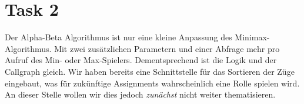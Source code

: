 \section{Task 2}
Der Alpha-Beta Algorithmus ist nur eine kleine Anpassung des Minimax-Algorithmus. Mit zwei zusätzlichen Parametern und einer Abfrage mehr pro Aufruf des Min- oder Max-Spielers. Dementsprechend ist die Logik und der Callgraph gleich. Wir haben bereits eine Schnittstelle für das Sortieren der Züge eingebaut, was für zukünftige Assignments wahrscheinlich eine Rolle spielen wird. An dieser Stelle wollen wir dies jedoch \textit{zunächst} nicht weiter thematisieren.
